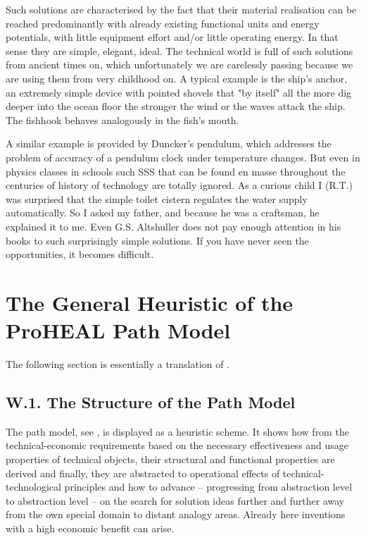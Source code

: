 \documentclass[11pt,a4paper]{article}
\begin{document}
Such solutions are characterised by the fact that their material realisation
can be reached predominantly with already existing functional units and energy
potentials, with little equipment effort and/or little operating energy. In
that sense they are simple, elegant, ideal. The technical world is full of
such solutions from ancient times on, which unfortunately we are carelessly
passing because we are using them from very childhood on. A typical example is
the ship's anchor, an extremely simple device with pointed shovels that "by
itself" all the more dig deeper into the ocean floor the stronger the wind or
the waves attack the ship.  The fishhook behaves analogously in the fish's
mouth.

A similar example is provided by Duncker's pendulum, which addresses the
problem of accuracy of a pendulum clock under temperature changes. But even in
physics classes in schools such SSS that can be found en masse throughout the
centuries of history of technology are totally ignored. As a curious child I
(R.T.) was surprised that the simple toilet cistern regulates the water
supply automatically.  So I asked my father, and because he was a craftsman,
he explained it to me. Even G.S. Altshuller does not pay enough attention in
his books to such surprisingly simple solutions. If you have never seen the
opportunities, it becomes difficult.

\section{The General Heuristic of the ProHEAL Path Model}

The following section is essentially a translation of \cite[ch. 5]{RM-21}.

\subsection*{W.1. The Structure of the Path Model}

The path model, see \cite[Appendix 1]{ProHEAL-21}, is displayed as a heuristic
scheme. It shows how from the technical-economic requirements based on the
necessary effectiveness and usage properties of technical objects, their
structural and functional properties are derived and finally, they are
abstracted to operational effects of technical-technological principles and
how to advance -- progressing from abstraction level to abstraction level --
on the search for solution ideas further and further away from the own special
domain to distant analogy areas.  Already here inventions with a high economic
benefit can arise.
\end{document}
